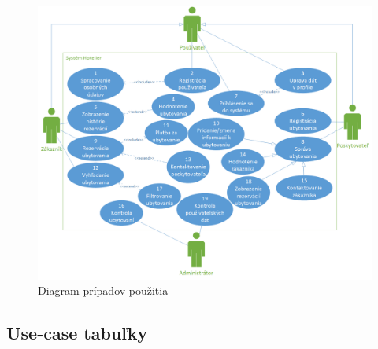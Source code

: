 \begin{figure}[!htbp]
  \centering
  \includegraphics[width=\linewidth]{img/uc_diagram.png}
  \caption{Diagram prípadov použitia}
  \label{uc_diagram}
\end{figure}	

\newpage

\subsection{Use-case tabuľky}

